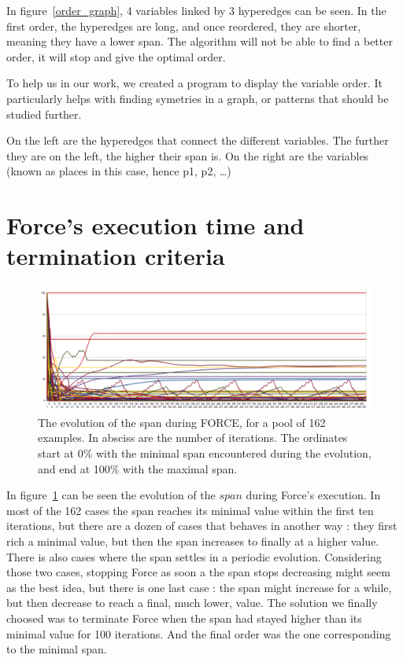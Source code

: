 \documentclass[12pt]{report}
\begin{document}
In figure~\ref{order_graph}, 4 variables linked by 3 hyperedges can be seen. In the first order, the hyperedges are long, and once reordered, they are shorter, meaning they have a lower span. The algorithm will not be able to find a better order, it will stop and give the optimal order.

To help us in our work, we created a program to display the variable order. It particularly helps with finding symetries in a graph, or patterns that should be studied further.

On the left are the hyperedges that connect the different variables. The further they are on the left, the higher their span is. On the right are the variables (known as places in this case, hence p1, p2, \ldots)


\section{Force's execution time and termination criteria}

\begin{figure}[H]
  \begin{center}
  \includegraphics[width=1\textwidth]{images/force_plot.png}
  \end{center}
  \caption{The evolution of the span during FORCE, for a pool of 162 examples. In absciss are the number of iterations. The ordinates start at 0\% with the minimal span encountered during the evolution, and end at 100\% with the maximal span.}
  \label{force_plot}
\end{figure}

In figure~\ref{force_plot} can be seen the evolution of the $span$ during Force's execution. In most of the 162 cases the span reaches its minimal value within the first ten iterations, but there are a dozen of cases that behaves in another way : they first rich a minimal value, but then the span increases to finally at a higher value. There is also cases where the span settles in a periodic evolution. Considering those two cases, stopping Force as soon a the span stops decreasing might seem as the best idea, but there is one last case : the span might increase for a while, but then decrease to reach a final, much lower, value.
The solution we finally choosed was to terminate Force when the span had stayed higher than its minimal value for 100 iterations. And the final order was the one corresponding to the minimal span.
\end{document}
